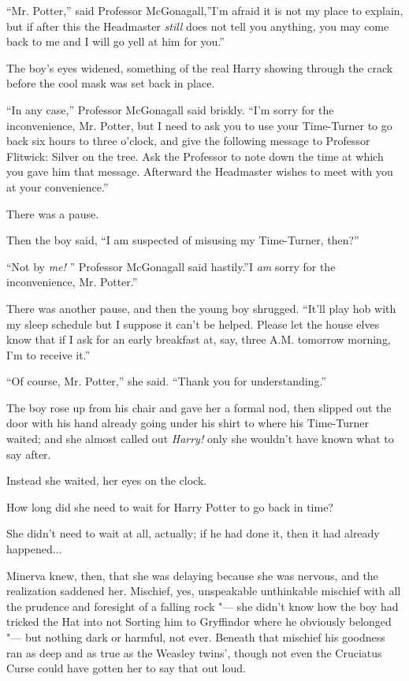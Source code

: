 ``Mr. Potter,'' said Professor McGonagall,''I'm afraid it is not my
place to explain, but if after this the Headmaster \emph{still} does not
tell you anything, you may come back to me and I will go yell at him for
you.''

The boy's eyes widened, something of the real Harry showing through the
crack before the cool mask was set back in place.

``In any case,'' Professor McGonagall said briskly. ``I'm sorry for the
inconvenience, Mr. Potter, but I need to ask you to use your Time-Turner
to go back six hours to three o'clock, and give the following message to
Professor Flitwick: Silver on the tree. Ask the Professor to note down
the time at which you gave him that message. Afterward the Headmaster
wishes to meet with you at your convenience.''

There was a pause.

Then the boy said, ``I am suspected of misusing my Time-Turner, then?''

``Not by \emph{me!} '' Professor McGonagall said hastily.''I \emph{am}
sorry for the inconvenience, Mr. Potter.''

There was another pause, and then the young boy shrugged. ``It'll play
hob with my sleep schedule but I suppose it can't be helped. Please let
the house elves know that if I ask for an early breakfast at, say, three
A.M. tomorrow morning, I'm to receive it.''

``Of course, Mr. Potter,'' she said. ``Thank you for understanding.''

The boy rose up from his chair and gave her a formal nod, then slipped
out the door with his hand already going under his shirt to where his
Time-Turner waited; and she almost called out \emph{Harry!} only she
wouldn't have known what to say after.

Instead she waited, her eyes on the clock.

How long did she need to wait for Harry Potter to go back in time?

She didn't need to wait at all, actually; if he had done it, then it had
already happened...

Minerva knew, then, that she was delaying because she was nervous, and
the realization saddened her. Mischief, yes, unspeakable unthinkable
mischief with all the prudence and foresight of a falling rock "--- she
didn't know how the boy had tricked the Hat into not Sorting him to
Gryffindor where he obviously belonged "--- but nothing dark or harmful,
not ever. Beneath that mischief his goodness ran as deep and as true as
the Weasley twins', though not even the Cruciatus Curse could have
gotten her to say that out loud.

